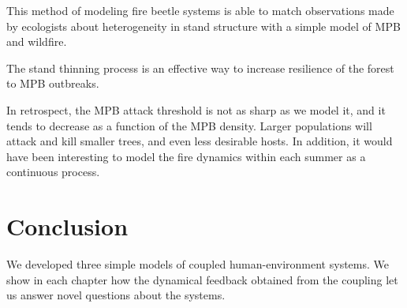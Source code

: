 \documentclass{article}
\begin{document}
This method of modeling fire beetle systems is able to match observations made by ecologists about heterogeneity in stand structure with a simple model of MPB and wildfire. 

The stand thinning process is an effective way to increase resilience of the forest to MPB outbreaks. 

In retrospect, the MPB attack threshold is not as sharp as we model it, and it tends to decrease as a function of the MPB density. Larger populations will attack and kill smaller trees, and even less desirable hosts. In addition, it would have been interesting to model the fire dynamics within each summer as a continuous process.  
\section{Conclusion} 

We developed three simple models of coupled human-environment systems. We show in each chapter how the dynamical feedback obtained from the coupling let us answer novel questions about the systems.
\section{}
\end{document}
